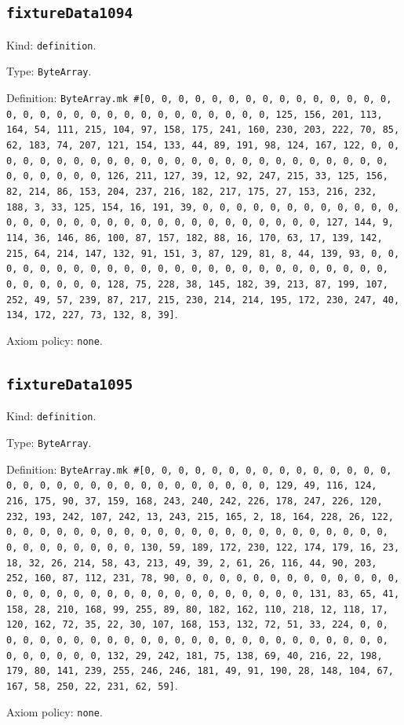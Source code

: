 \documentclass[11pt]{article}
\begin{document}
\subsection*{\texttt{fixtureData1094}}
\noindent Kind: \texttt{definition}.\par
\noindent Type: \texttt{ByteArray}.\par
\noindent Definition: \texttt{ByteArray.mk \#[0, 0, 0, 0, 0, 0, 0, 0, 0, 0, 0, 0, 0, 0, 0, 0, 0, 0, 0, 0, 0, 0, 0, 0, 0, 0, 0, 0, 0, 0, 0, 125, 156, 201, 113, 164, 54, 111, 215, 104, 97, 158, 175, 241, 160, 230, 203, 222, 70, 85, 62, 183, 74, 207, 121, 154, 133, 44, 89, 191, 98, 124, 167, 122, 0, 0, 0, 0, 0, 0, 0, 0, 0, 0, 0, 0, 0, 0, 0, 0, 0, 0, 0, 0, 0, 0, 0, 0, 0, 0, 0, 0, 0, 0, 0, 126, 211, 127, 39, 12, 92, 247, 215, 33, 125, 156, 82, 214, 86, 153, 204, 237, 216, 182, 217, 175, 27, 153, 216, 232, 188, 3, 33, 125, 154, 16, 191, 39, 0, 0, 0, 0, 0, 0, 0, 0, 0, 0, 0, 0, 0, 0, 0, 0, 0, 0, 0, 0, 0, 0, 0, 0, 0, 0, 0, 0, 0, 0, 0, 127, 144, 9, 114, 36, 146, 86, 100, 87, 157, 182, 88, 16, 170, 63, 17, 139, 142, 215, 64, 214, 147, 132, 91, 151, 3, 87, 129, 81, 8, 44, 139, 93, 0, 0, 0, 0, 0, 0, 0, 0, 0, 0, 0, 0, 0, 0, 0, 0, 0, 0, 0, 0, 0, 0, 0, 0, 0, 0, 0, 0, 0, 0, 0, 128, 75, 228, 38, 145, 182, 39, 213, 87, 199, 107, 252, 49, 57, 239, 87, 217, 215, 230, 214, 214, 195, 172, 230, 247, 40, 134, 172, 227, 73, 132, 8, 39]}.\par
\noindent Axiom policy: \texttt{none}.\par
\subsection*{\texttt{fixtureData1095}}
\noindent Kind: \texttt{definition}.\par
\noindent Type: \texttt{ByteArray}.\par
\noindent Definition: \texttt{ByteArray.mk \#[0, 0, 0, 0, 0, 0, 0, 0, 0, 0, 0, 0, 0, 0, 0, 0, 0, 0, 0, 0, 0, 0, 0, 0, 0, 0, 0, 0, 0, 0, 0, 129, 49, 116, 124, 216, 175, 90, 37, 159, 168, 243, 240, 242, 226, 178, 247, 226, 120, 232, 193, 242, 107, 242, 13, 243, 215, 165, 2, 18, 164, 228, 26, 122, 0, 0, 0, 0, 0, 0, 0, 0, 0, 0, 0, 0, 0, 0, 0, 0, 0, 0, 0, 0, 0, 0, 0, 0, 0, 0, 0, 0, 0, 0, 0, 130, 59, 189, 172, 230, 122, 174, 179, 16, 23, 18, 32, 26, 214, 58, 43, 213, 49, 39, 2, 61, 26, 116, 44, 90, 203, 252, 160, 87, 112, 231, 78, 90, 0, 0, 0, 0, 0, 0, 0, 0, 0, 0, 0, 0, 0, 0, 0, 0, 0, 0, 0, 0, 0, 0, 0, 0, 0, 0, 0, 0, 0, 0, 0, 131, 83, 65, 41, 158, 28, 210, 168, 99, 255, 89, 80, 182, 162, 110, 218, 12, 118, 17, 120, 162, 72, 35, 22, 30, 107, 168, 153, 132, 72, 51, 33, 224, 0, 0, 0, 0, 0, 0, 0, 0, 0, 0, 0, 0, 0, 0, 0, 0, 0, 0, 0, 0, 0, 0, 0, 0, 0, 0, 0, 0, 0, 0, 0, 132, 29, 242, 181, 75, 138, 69, 40, 216, 22, 198, 179, 80, 141, 239, 255, 246, 246, 181, 49, 91, 190, 28, 148, 104, 67, 167, 58, 250, 22, 231, 62, 59]}.\par
\noindent Axiom policy: \texttt{none}.\par
\end{document}
